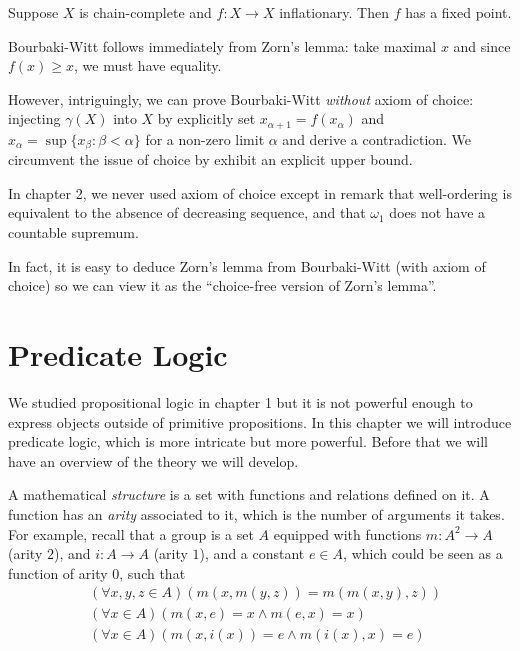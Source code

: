 \documentclass[a4paper]{article}
\begin{document}
\begin{theorem}
  Suppose \(X\) is chain-complete and \(f: X \to X\) inflationary. Then \(f\) has a fixed point.
\end{theorem}

Bourbaki-Witt follows immediately from Zorn's lemma: take maximal \(x\) and since \(f(x) \geq x\), we must have equality.

However, intriguingly, we can prove Bourbaki-Witt \emph{without} axiom of choice: injecting \(\gamma(X)\) into \(X\) by explicitly set \(x_{\alpha + 1} = f(x_\alpha)\) and \(x_\alpha = \sup\{x_\beta: \beta < \alpha\}\) for a non-zero limit \(\alpha\) and derive a contradiction. We circumvent the issue of choice by exhibit an explicit upper bound.

\begin{note}
  In chapter 2, we never used axiom of choice except in remark that well-ordering is equivalent to the absence of decreasing sequence, and that \(\omega_1\) does not have a countable supremum.
\end{note}

In fact, it is easy to deduce Zorn's lemma from Bourbaki-Witt (with axiom of choice) so we can view it as the ``choice-free version of Zorn's lemma''.

\section{Predicate Logic}

We studied propositional logic in chapter 1 but it is not powerful enough to express objects outside of primitive propositions. In this chapter we will introduce predicate logic, which is more intricate but more powerful. Before that we will have an overview of the theory we will develop.

A mathematical \emph{structure} is a set with functions and relations defined on it. A function has an \emph{arity} associated to it, which is the number of arguments it takes. For example, recall that a group is a set \(A\) equipped with functions \(m: A^2 \to A\) (arity \(2\)), and \(i: A \to A\) (arity \(1\)), and a constant \(e \in A\), which could be seen as a function of arity \(0\), such that
\begin{align*}
  & (\forall x, y, z \in A) (m(x, m(y, z)) = m(m(x, y), z)) \\
  & (\forall x \in A) (m(x, e) = x \land m(e, x) = x) \\
  & (\forall x \in A) (m(x, i(x)) = e \land m(i(x), x) = e)
\end{align*}
\end{document}
